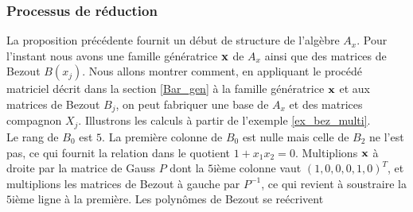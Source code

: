 \documentclass{standalone}
\begin{document}
\subsubsection{Processus de réduction}
La proposition précédente fournit un début de structure de l'algèbre $A_x$. Pour l'instant nous avons une famille génératrice $\bold{x}$ de $A_x$ ainsi que des matrices de Bezout $B(x_j)$.
Nous allons montrer comment, en appliquant le procédé matriciel décrit dans la section \ref{Bar_gen} à la famille génératrice $\bold{x}$ et aux matrices de Bezout $B_j$, on peut fabriquer une base de $A_x$ et des matrices compagnon $X_j$.
Illustrons les calculs à partir de l'exemple \ref{ex_bez_multi}.\\
Le rang de $B_0$ est $5$. La première colonne de $B_0$ est nulle mais celle de $B_2$ ne l'est pas, ce qui fournit la relation dans le quotient $1 + x_1x_2 = 0$.
Multiplions $\bold{x}$ à droite par la matrice de Gauss $P$ dont la $5$ième colonne vaut $(1, 0, 0, 0, 1, 0)^{T}$, et multiplions les matrices de Bezout à gauche par $P^{-1}$, ce qui revient à soustraire la $5$ième ligne à la première.
Les polynômes de Bezout se reécrivent\\
\end{document}
